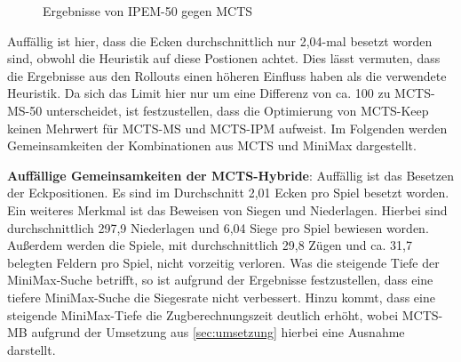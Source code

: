 \documentclass[12pt,a4paper,bibliography=totocnumbered,listof=totocnumbered]{article}
\begin{document}
\begin{figure} [h]
\centering

\begin{minipage}{0.4\linewidth}
\end{minipage}
\qquad
\begin{minipage}{0.4\linewidth}
\end{minipage}
\caption{Ergebnisse von IPEM-50 gegen MCTS}
\label{abb:win_ipem}
\end{figure}
Auffällig ist hier, dass die Ecken durchschnittlich nur 2,04-mal besetzt worden sind, obwohl die Heuristik auf diese Postionen achtet. Dies lässt vermuten, dass die Ergebnisse aus den Rollouts einen höheren Einfluss haben als die verwendete Heuristik. Da sich das Limit hier nur um eine Differenz von ca. 100 zu MCTS-MS-50 unterscheidet, ist festzustellen, dass die Optimierung von MCTS-Keep keinen Mehrwert für MCTS-MS und MCTS-IPM aufweist. Im Folgenden werden Gemeinsamkeiten der Kombinationen aus MCTS und MiniMax dargestellt.

\textbf{Auffällige Gemeinsamkeiten der MCTS-Hybride}: Auffällig ist das Besetzen der Eckpositionen. Es sind im Durchschnitt 2,01 Ecken pro Spiel besetzt worden. Ein weiteres Merkmal ist das Beweisen von Siegen und Niederlagen. Hierbei sind durchschnittlich 297,9 Niederlagen und 6,04 Siege pro Spiel bewiesen worden. Außerdem werden die Spiele, mit durchschnittlich 29,8 Zügen und ca. 31,7 belegten Feldern pro Spiel, nicht vorzeitig verloren. Was die steigende Tiefe der MiniMax-Suche betrifft, so ist aufgrund der Ergebnisse festzustellen, dass eine tiefere MiniMax-Suche die Siegesrate nicht verbessert. Hinzu kommt, dass eine steigende MiniMax-Tiefe die Zugberechnungszeit deutlich erhöht, wobei MCTS-MB aufgrund der Umsetzung aus \autoref{sec:umsetzung} hierbei eine Ausnahme darstellt.
\end{document}
